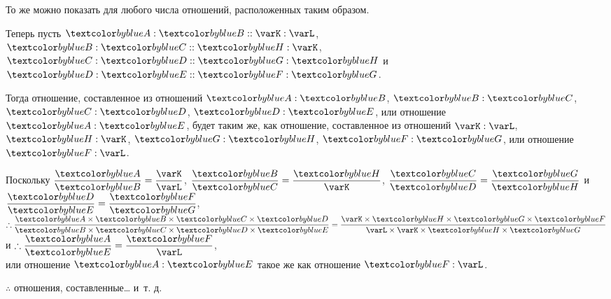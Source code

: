\documentclass[letters,booklanguage=russian]{byrnebook}
\begin{document}
То же можно показать для любого числа отношений, расположенных таким образом.

\begin{center}
Теперь пусть $\varA : \varB :: \varK : \varL$, $\varB : \varC :: \varH : \varK$, $\varC : \varD :: \varG : \varH$ и $\varD : \varE :: \varF : \varG$.
\end{center}

Тогда отношение, составленное из отношений $\varA : \varB$, $\varB : \varC$, $\varC : \varD$, $\varD : \varE$, или отношение $\varA : \varE$, будет таким же, как отношение, составленное из отношений $\varK : \varL$, $\varH : \varK$, $\varG : \varH$, $\varF : \varG$, или отношение $\varF : \varL$.

\begin{center}
Поскольку $\dfrac{\varA}{\varB} = \dfrac{\varK}{\varL}$, $\dfrac{\varB}{\varC} = \dfrac{\varH}{\varK}$, $\dfrac{\varC}{\varD} = \dfrac{\varG}{\varH}$ и $\dfrac{\varD}{\varE} = \dfrac{\varF}{\varG}$,\\
$\therefore \dfrac{\varA \times \varB \times \varC \times \varD}{\varB \times \varC \times \varD \times \varE} = \dfrac{\varK \times \varH \times \varG \times \varF}{\varL \times \varK \times \varH \times \varG}$ и $\therefore \dfrac{\varA}{\varE} = \dfrac{\varF}{\varL}$,\\
или отношение $\varA : \varE$ такое же как отношение $\varF : \varL$.

$\therefore$ отношения, составленные… и~т. д.
\end{center}

\vfill\pagebreak

\def\varA{\textcolor{byblue}{A}}
\def\varB{\textcolor{byblue}{B}}
\def\varC{\textcolor{byblue}{C}}
\def\varD{\textcolor{byblue}{D}}
\def\varE{\textcolor{byblue}{E}}
\def\varF{\textcolor{byblue}{F}}
\def\varG{\textcolor{byblue}{G}}
\def\varH{\textcolor{byblue}{H}}
\def\varP{\textcolor{byred}{P}}
\def\varQ{\textcolor{byred}{Q}}
\def\varR{\textcolor{byred}{R}}
\def\varS{\textcolor{byred}{S}}
\def\varT{\textcolor{byred}{T}}
\def\varV{\textcolor{byyellow}{V}}
\def\varW{\textcolor{byyellow}{W}}
\def\varX{\textcolor{byyellow}{X}}
\def\varY{\textcolor{byyellow}{Y}}
\def\varZ{\textcolor{byyellow}{Z}}
\end{document}
